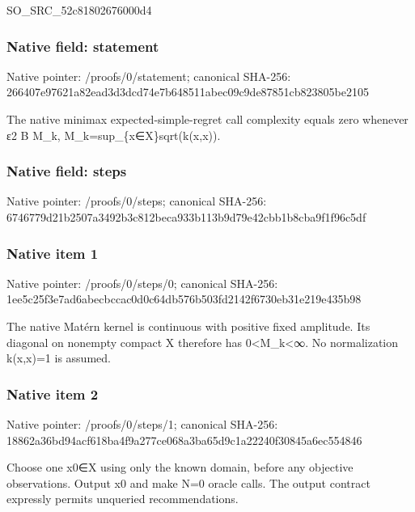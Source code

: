 \documentclass[10pt,a4paper]{article}
\begin{document}
\begingroup\raggedright\sloppy SO\_\allowbreak{}SRC\_\allowbreak{}52c81802676000d4\par\endgroup

\subsubsection{Native field: statement}
Native pointer: /proofs/0/statement; canonical SHA-256: 266407e97621a82ead3d3dcd74e7b648511abec09c9de87851cb823805be2105

\begingroup\raggedright\sloppy The native minimax expected-simple-regret call complexity equals zero whenever {\AtlasUnicodeText ε}\allowbreak{}2 B M\_\allowbreak{}k,\allowbreak{} M\_\allowbreak{}k=\allowbreak{}sup\_\allowbreak{}\{x{\AtlasUnicodeSymbols ∈}\allowbreak{}X\}sqrt(k(x,\allowbreak{}x)).\par\endgroup

\subsubsection{Native field: steps}
Native pointer: /proofs/0/steps; canonical SHA-256: 6746779d21b2507a3492b3c812beca933b113b9d79e42cbb1b8cba9f1f96c5df

\subsubsection{Native item 1}
Native pointer: /proofs/0/steps/0; canonical SHA-256: 1ee5c25f3e7ad6abecbccac0d0c64db576b503fd2142f6730eb31e219e435b98

\begingroup\raggedright\sloppy The native Mat{\AtlasUnicodeText é}\allowbreak{}rn kernel is continuous with positive fixed amplitude. Its diagonal on nonempty compact X therefore has 0<M\_\allowbreak{}k<{\AtlasUnicodeSymbols ∞}\allowbreak{}. No normalization k(x,\allowbreak{}x)=\allowbreak{}1 is assumed.\par\endgroup

\subsubsection{Native item 2}
Native pointer: /proofs/0/steps/1; canonical SHA-256: 18862a36bd94acf618ba4f9a277ce068a3ba65d9c1a22240f30845a6ec554846

\begingroup\raggedright\sloppy Choose one x0{\AtlasUnicodeSymbols ∈}\allowbreak{}X using only the known domain,\allowbreak{} before any objective observations. Output x0 and make N=\allowbreak{}0 oracle calls. The output contract expressly permits unqueried recommendations.\par\endgroup
\end{document}
